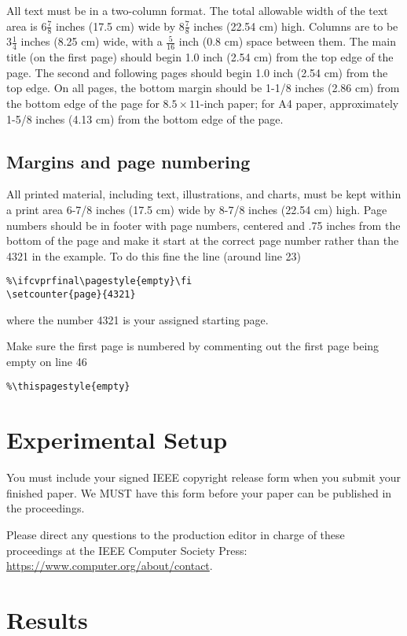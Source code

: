 \documentclass[10pt,twocolumn,letterpaper]{article}
\begin{document}
All text must be in a two-column format. The total allowable width of the
text area is $6\frac78$ inches (17.5 cm) wide by $8\frac78$ inches (22.54
cm) high. Columns are to be $3\frac14$ inches (8.25 cm) wide, with a
$\frac{5}{16}$ inch (0.8 cm) space between them. The main title (on the
first page) should begin 1.0 inch (2.54 cm) from the top edge of the
page. The second and following pages should begin 1.0 inch (2.54 cm) from
the top edge. On all pages, the bottom margin should be 1-1/8 inches (2.86
cm) from the bottom edge of the page for $8.5 \times 11$-inch paper; for A4
paper, approximately 1-5/8 inches (4.13 cm) from the bottom edge of the
page.

\subsection{Margins and page numbering}

All printed material, including text, illustrations, and charts, must be kept
within a print area 6-7/8 inches (17.5 cm) wide by 8-7/8 inches (22.54 cm)
high.
Page numbers should be in footer with page numbers, centered and .75
inches from the bottom of the page and make it start at the correct page
number rather than the 4321 in the example.  To do this fine the line (around
line 23)
\begin{verbatim}
%\ifcvprfinal\pagestyle{empty}\fi
\setcounter{page}{4321}
\end{verbatim}
where the number 4321 is your assigned starting page.

Make sure the first page is numbered by commenting out the first page being
empty on line 46
\begin{verbatim}
%\thispagestyle{empty}
\end{verbatim}


\section{Experimental Setup}

You must include your signed IEEE copyright release form when you submit
your finished paper. We MUST have this form before your paper can be
published in the proceedings.

Please direct any questions to the production editor in charge of these 
proceedings at the IEEE Computer Society Press: 
\url{https://www.computer.org/about/contact}. 


\section{Results}


{\small


}
\end{document}
